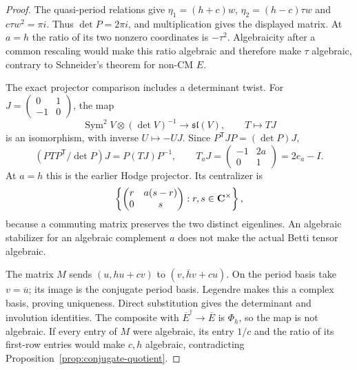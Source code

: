 \documentclass[11pt]{article}
\theoremstyle{definition}\newtheorem{definition}[theorem]{Definition}
\theoremstyle{remark}\newtheorem{remark}[theorem]{Remark}
\begin{document}
\begin{proof}
The quasi-period relations give $\eta_1=(h+c)w$, $\eta_2=(h-c)\tau w$ and $c\tau w^2=\pi i$. Thus $\det P=2\pi i$, and multiplication gives the displayed matrix. At $a=h$ the ratio of its two nonzero coordinates is $-\tau^2$. Algebraicity after a common rescaling would make this ratio algebraic and therefore make $\tau$ algebraic, contrary to Schneider's theorem for non-CM $E$.

The exact projector comparison includes a determinant twist. For
$J=\left(\begin{smallmatrix}0&1\\-1&0\end{smallmatrix}\right)$, the map
\[
 \operatorname{Sym}^2V\otimes(\det V)^{-1}\longrightarrow\mathfrak{sl}(V),
 \qquad T\longmapsto TJ
\]
is an isomorphism, with inverse $U\mapsto-UJ$. Since $P^{\mathsf T}JP=(\det P)J$,
\[
 (PTP^{\mathsf T}/\det P)J=P(TJ)P^{-1},\qquad
 T_aJ=\begin{pmatrix}-1&2a\\0&1\end{pmatrix}=2e_a-I.
\]
At $a=h$ this is the earlier Hodge projector. Its centralizer is
\[
 \left\{\begin{pmatrix}r&a(s-r)\\0&s\end{pmatrix}:r,s\in\mathbf C^\times\right\},
\]
because a commuting matrix preserves the two distinct eigenlines. An algebraic stabilizer for an algebraic complement $a$ does not make the actual Betti tensor algebraic.

The matrix $M$ sends $(u,hu+cv)$ to $(v,\overline h v+cu)$. On the period basis take $v=\overline u$; its image is the conjugate period basis. Legendre makes this a complex basis, proving uniqueness. Direct substitution gives the determinant and involution identities. The composite with $\overline E^\dagger\to\overline E$ is $\Phi_h$, so the map is not algebraic. If every entry of $M$ were algebraic, its entry $1/c$ and the ratio of its first-row entries would make $c,h$ algebraic, contradicting Proposition~\ref{prop:conjugate-quotient}.
\end{proof}
\end{document}
